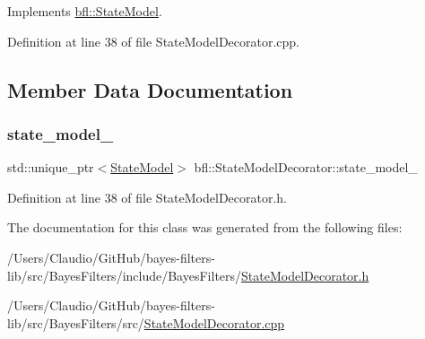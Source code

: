 Implements \mbox{\hyperlink{classbfl_1_1StateModel_ac86dcdad8f0bbfab39a23e592779feaa}{bfl\+::\+State\+Model}}.



Definition at line 38 of file State\+Model\+Decorator.\+cpp.



\subsection{Member Data Documentation}
\mbox{\label{classbfl_1_1StateModelDecorator_acd7df6c203047dfa16ef78dd34c1b769}} 
\subsubsection{\texorpdfstring{state\+\_\+model\+\_\+}{state\_model\_}}
{\footnotesize\ttfamily std\+::unique\+\_\+ptr$<$\mbox{\hyperlink{classbfl_1_1StateModel}{State\+Model}}$>$ bfl\+::\+State\+Model\+Decorator\+::state\+\_\+model\+\_\+\hspace{0.3cm}{\ttfamily [private]}}



Definition at line 38 of file State\+Model\+Decorator.\+h.



The documentation for this class was generated from the following files\+:\begin{DoxyCompactItemize}
\item 
/\+Users/\+Claudio/\+Git\+Hub/bayes-\/filters-\/lib/src/\+Bayes\+Filters/include/\+Bayes\+Filters/\mbox{\hyperlink{StateModelDecorator_8h}{State\+Model\+Decorator.\+h}}\item 
/\+Users/\+Claudio/\+Git\+Hub/bayes-\/filters-\/lib/src/\+Bayes\+Filters/src/\mbox{\hyperlink{StateModelDecorator_8cpp}{State\+Model\+Decorator.\+cpp}}\end{DoxyCompactItemize}
